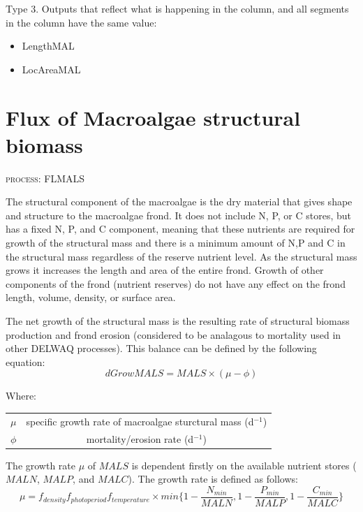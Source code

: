 \documentclass{deltares_manual}
\begin{document}
Type 3. Outputs that reflect what is happening in the column, and all segments in the column have the same value:
\begin{itemize}
	\item LengthMAL
	\item LocAreaMAL
\end{itemize}


\pagebreak

\section{Flux of Macroalgae structural biomass}
\begin{flushright}
\textsc{process: FLMALS}
\end{flushright}

The structural component of the macroalgae is the dry material that gives shape and structure to the macroalgae frond. It does not include N, P, or C stores, but has a fixed N, P, and C component, meaning that these nutrients are required for growth of the structural mass and there is a minimum amount of N,P and C in the structural mass regardless of the reserve nutrient level. As the structural mass grows it increases the length and area of the entire frond. Growth of other components of the frond (nutrient reserves) do not have any effect on the frond length, volume, density, or surface area. 

The net growth of the structural mass is the resulting rate of structural biomass production and frond erosion (considered to be analagous to mortality used in other DELWAQ processes). This balance can be defined by the following equation:
\begin{equation}
	dGrowMALS =MALS \times (\mu - \phi)
\end{equation}

Where:\\
\begin{tabular}{cc}
	$\mu$  & specific growth rate of macroalgae sturctural mass (d$^{-1}$) \\
	$\phi$ & mortality/erosion rate (d$^{-1}$) \\
\end{tabular}

The growth rate $\mu$ of $MALS$ is dependent firstly on the available nutrient stores ($MALN$, $MALP$, and $MALC$). The growth rate is defined as follows:
\begin{equation}
	\mu = f_{density} f_{photoperiod} f_{temperature}\times min\big\{1-\frac{N_{min}}{MALN},1-\frac{P_{min}}{MALP},1-\frac{C_{min}}{MALC}\big\}
\end{equation}
\end{document}
